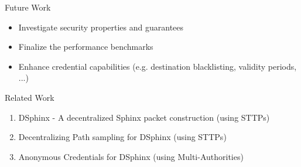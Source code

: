 \begin{frame}{Future Work}
    \begin{itemize}\setlength\itemsep{5mm}
        \item Investigate security properties and guarantees
        \item Finalize the performance benchmarks
        \item Enhance credential capabilities {\color{gray}(e.g. destination blacklisting, validity periods, ...)}
    \end{itemize}
\end{frame}

\begin{frame}{Related Work}
    \begin{enumerate}\setlength\itemsep{6mm}
        \item DSphinx - A decentralized Sphinx packet construction \hfill {\color{gray}(using STTPs)}
        \item Decentralizing Path sampling for DSphinx \hfill {\color{gray}(using STTPs)}
        \item Anonymous Credentials for DSphinx \hfill {\color{gray}(using Multi-Authorities)}
    \end{enumerate}
\end{frame}